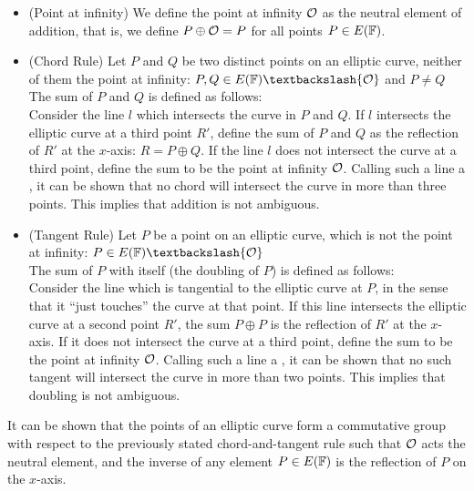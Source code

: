\begin{definition}\label{def:chord-and-tangent}


\begin{itemize}
\label{def:chord-and-tangent}
\item (Point at infinity) We define the point at infinity $\mathcal{O}$ as the neutral element of addition, that is, we define $P\oplus\mathcal{O} = P$ for all points $P\in E(\mathbb{F})$.
\item (Chord Rule) Let $P$ and $Q$ be two distinct points on an elliptic curve, neither of them the point at infinity: $P, Q\in E(\F)\textbackslash \{\Oinf\}$ and $P\neq Q$\\
The sum of $P$ and $Q$ is defined as follows:\\
Consider the line $l$ which intersects the curve in $P$ and $Q$. If $l$ intersects the elliptic curve at a third point $R'$, define the sum of $P$ and $Q$ as the reflection of $R'$ at the $x$-axis: $R=P\oplus Q$. If the line $l$ does not intersect the curve at a third point, define the sum to be the point at infinity $\mathcal{O}$. Calling such a line a , it can be shown that no chord will intersect the curve in more than three points. This implies that addition is not ambiguous.
\item (Tangent Rule) Let $P$ be a point on an elliptic curve, which is not the point at infinity: $P \in E(\F)\textbackslash \{\Oinf\}$\\
 The sum of $P$ with itself (the doubling of $P$) is defined as follows:\\
Consider the line which is tangential to the elliptic curve at $P$, in the sense that it ``just touches'' the curve at that point. If this line intersects the elliptic curve at a second point $R'$, the sum $P\oplus P$ is the reflection of $R'$ at the $x$-axis. If it does not intersect the curve at a third point, define the sum to be the point at infinity $\mathcal{O}$. Calling such a line a , it can be shown that no such tangent will intersect the curve in more than two points. This implies that doubling is not ambiguous.
\end{itemize}
\end{definition}

It can be shown that the points of an elliptic curve form a commutative group with respect to the previously stated chord-and-tangent rule such that $\mathcal{O}$ acts the neutral element, and the inverse of any element $P\in E(\mathbb{F})$ is the reflection of $P$ on the $x$-axis. 

